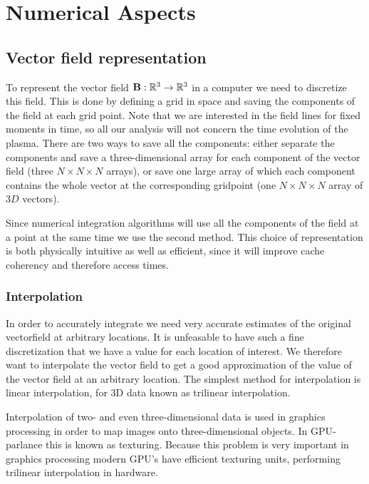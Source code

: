 \documentclass{article}
\renewcommand{\vec}{\bold}
\begin{document}
\section{Numerical Aspects}
\subsection{Vector field representation}
To represent the vector field $\vec{B}: \mathbb{R}^3 \to \mathbb{R}^3$ in a computer we need to discretize this field. This is done by defining a grid in space and saving the components of the field at each grid point. Note that we are interested in the field lines for fixed moments in time, so all our analysis will not concern the time evolution of the plasma. There are two ways to save all the components: either separate the components and save a three-dimensional array for each component of the vector field (three $N\times N\times N$ arrays), or save one large array of which each component contains the whole vector at the corresponding gridpoint (one $N\times N\times N$ array of $3D$ vectors).

Since numerical integration algorithms will use all the components of the field at a point at the same time we use the second method. %
This choice of representation is both physically intuitive as well as efficient, since it will improve cache coherency and therefore access times.

\subsubsection{Interpolation}
In order to accurately integrate we need very accurate estimates of the original vectorfield at arbitrary locations. It is unfeasable to have such a fine discretization that we have a value for each location of interest. We therefore want to interpolate the vector field to get a good approximation of the value of the vector field at an arbitrary location. The simplest method for interpolation is linear interpolation, for 3D data known as trilinear interpolation.

Interpolation of two- and even three-dimensional data is used in graphics processing in order to map images onto three-dimensional objects. In GPU-parlance this is known as texturing. Because this problem is very important in graphics processing modern GPU's have efficient texturing units, performing trilinear interpolation in hardware.
\end{document}
